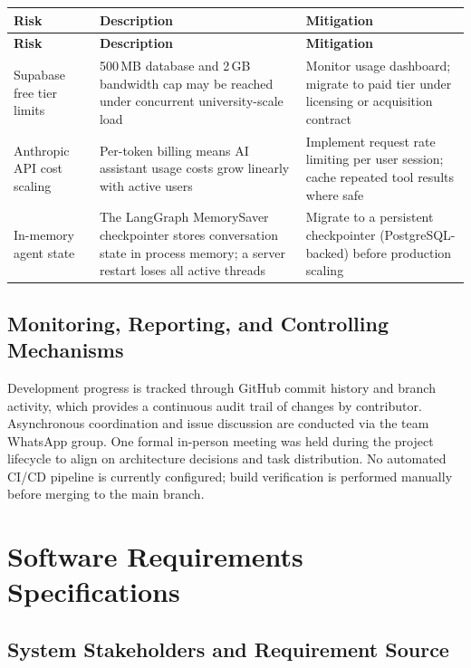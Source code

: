 \documentclass[12pt,a4paper]{article}
\begin{document}
\begin{longtable}{@{} L{4.5cm} L{5.5cm} L{4.5cm} @{}}
\toprule
\textbf{Risk} & \textbf{Description} & \textbf{Mitigation} \\
\midrule
\endfirsthead
\toprule
\textbf{Risk} & \textbf{Description} & \textbf{Mitigation} \\
\midrule
\endhead
\bottomrule
\endlastfoot
Supabase free tier limits &
  500\,MB database and 2\,GB bandwidth cap may be reached under concurrent university-scale load &
  Monitor usage dashboard; migrate to paid tier under licensing or acquisition contract \\[6pt]
Anthropic API cost scaling &
  Per-token billing means AI assistant usage costs grow linearly with active users &
  Implement request rate limiting per user session; cache repeated tool results where safe \\[6pt]
In-memory agent state &
  The LangGraph MemorySaver checkpointer stores conversation state in process memory; a server restart loses all active threads &
  Migrate to a persistent checkpointer (PostgreSQL-backed) before production scaling \\
\end{longtable}

\subsection{Monitoring, Reporting, and Controlling Mechanisms}

Development progress is tracked through GitHub commit history and branch activity,
which provides a continuous audit trail of changes by contributor. Asynchronous
coordination and issue discussion are conducted via the team WhatsApp group. One formal
in-person meeting was held during the project lifecycle to align on architecture decisions
and task distribution. No automated CI/CD pipeline is currently configured; build
verification is performed manually before merging to the main branch.

\newpage
\section{Software Requirements Specifications}

\subsection{System Stakeholders and Requirement Source}
\end{document}
